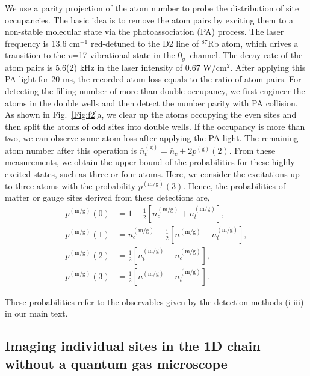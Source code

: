 \documentclass[aps,prl,twocolumn,superscriptaddress,footinbib,linenumbers]{revtex4}
\begin{document}
We use a parity projection of the atom number to probe the distribution of site occupancies. The basic idea is to remove the atom pairs by exciting them to a non-stable molecular state via the photoassociation (PA) process. The laser frequency is 13.6 $\text{cm}^{-1}$ red-detuned to the D2 line of $^{87}$Rb atom, which drives a transition to the $v$=17 vibrational state in the $0_g^-$ channel. The decay rate of the atom pairs is 5.6(2) kHz in the laser intensity of 0.67 W/cm$^{2}$. After applying this PA light for 20 ms, the recorded atom loss equals to the ratio of atom pairs. For detecting the filling number of more than double occupancy, we first engineer the atoms in the double wells and then detect the number parity with PA collision. As shown in Fig.~\ref{Fig:f2}a, we clear up the atoms occupying the even sites and then split the atoms of odd sites into double wells. If the occupancy is more than two, we can observe some atom loss after applying the PA light. The remaining atom number after this operation is $\bar{n}^{\mathrm{(g)}}_t = \bar{n}_c + 2 p^{\mathrm{(g)}}(2)$. From these measurements, we obtain the upper bound of the probabilities for these highly excited states, such as three or four atoms. Here, we consider the excitations up to three atoms with the probability $p^{\mathrm{(m/g)}}(3)$. Hence, the probabilities of matter or gauge sites derived from these detections are,
\begin{equation}
\begin{split}
p^{\mathrm{(m/g)}}(0)&=1- \frac{1}{2}\left[ \bar{n}^{\mathrm{(m/g)}}_c + \bar{n}^{\mathrm{(m/g)}}_t \right],\\
p^{\mathrm{(m/g)}}(1)&=\bar{n}^{\mathrm{(m/g)}}_c - \frac{1}{2}\left[\bar{n}^{\mathrm{(m/g)}} - \bar{n}^{\mathrm{(m/g)}}_t\right],\\
p^{\mathrm{(m/g)}}(2)&=\frac{1}{2}\left[\bar{n}^{\mathrm{(m/g)}}_t -\bar{n}^{\mathrm{(m/g)}}_c\right],\\
p^{\mathrm{(m/g)}}(3)&=\frac{1}{2}\left[\bar{n}^{\mathrm{(m/g)}}-\bar{n}^{\mathrm{(m/g)}}_t\right].
\end{split}
\end{equation}

These probabilities refer to the observables given by the detection methods (i-iii) in our main text.

\subsection{Imaging individual sites in the 1D chain without a quantum gas microscope}
\end{document}
